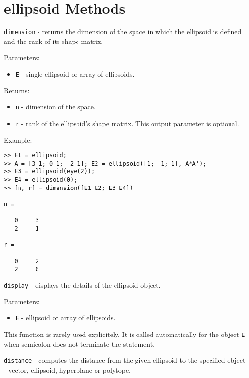\section{ellipsoid Methods}
{\Large {\tt dimension}} - returns the dimension of the space in which
the ellipsoid is defined and the rank of its shape matrix.

Parameters:
\begin{itemize}
\item {\tt E} - single ellipsoid or array of ellipsoids.
\end{itemize}

Returns:
\begin{itemize}
\item {\tt n} - dimension of the space.
\item {\tt r} - rank of the ellipsoid's shape matrix. This output parameter
is optional.
\end{itemize}

Example:
{\tt \begin{verbatim}
>> E1 = ellipsoid;
>> A = [3 1; 0 1; -2 1]; E2 = ellipsoid([1; -1; 1], A*A');
>> E3 = ellipsoid(eye(2));
>> E4 = ellipsoid(0);
>> [n, r] = dimension([E1 E2; E3 E4])

n =

   0     3
   2     1

r =

   0     2
   2     0
\end{verbatim} }

\newpage

{\Large {\tt display}} - displays the details of the ellipsoid object.

Parameters:
\begin{itemize}
\item {\tt E} - ellipsoid or array of ellipsoids.
\end{itemize}
This function is rarely used explicitely. It is called automatically
for the object {\tt E} when semicolon does not terminate the statement.

\newpage

{\Large {\tt distance}} - computes the distance from the given ellipsoid
to the specified object - vector, ellipsoid, hyperplane or polytope.

